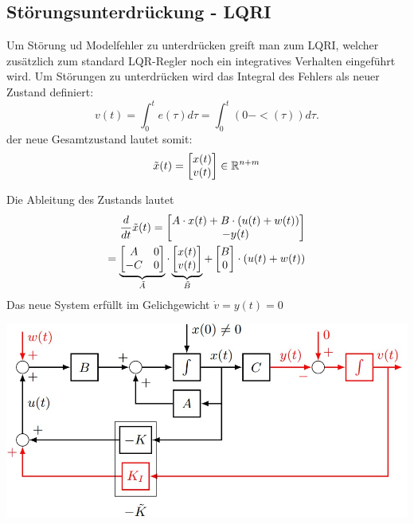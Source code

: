 \subsection{Störungsunterdrückung - LQRI}
Um Störung ud Modelfehler zu unterdrücken greift man zum LQRI, welcher zusätzlich zum standard LQR-Regler noch ein integratives Verhalten eingeführt wird. Um Störungen zu unterdrücken wird das Integral des Fehlers als neuer Zustand definiert: \[ v(t) = \int^t_0 e(\tau)d\tau = \int^t_0 (0-<(\tau))d\tau.\]
der neue Gesamtzustand lautet somit: \[\Tilde{x}(t) =\begin{bmatrix}
x(t) \\ v(t)
\end{bmatrix}\in \mathbb{R}^{n+m}\]

Die Ableitung des Zustands lautet
\begin{align*}
    \frac{d}{dt}\Tilde{x}(t) = \begin{bmatrix}A\cdot x(t) + B \cdot ( u(t) + w(t))\\-y(t)\end{bmatrix}\\
    = \underbrace{\begin{bmatrix}A&0\\-C & 0\end{bmatrix}}_{\Tilde{A}}\cdot\underbrace{\begin{bmatrix}x(t) \\v(t)\end{bmatrix}}_{\Tilde{B}}+\begin{bmatrix}B \\ 0 \end{bmatrix} \cdot(u(t)+w(t))
\end{align*}
Das neue System erfüllt im Gelichgewicht $\dot v = y(t) = 0$

\includegraphics[width=0.8\linewidth]{images/08/LQRI.jpg}

